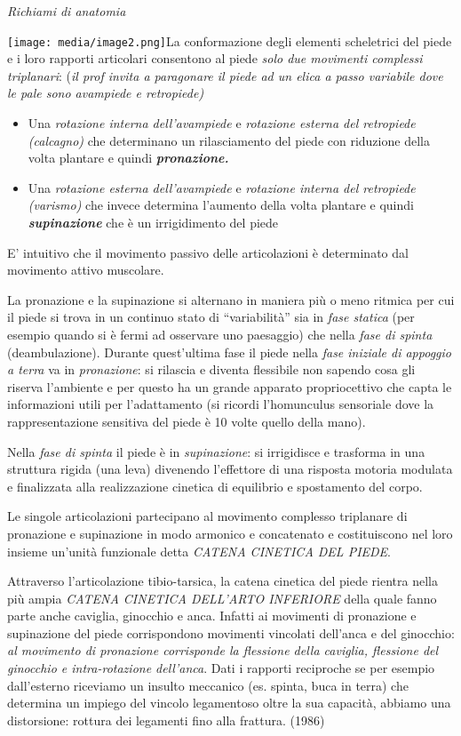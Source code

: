 \documentclass[]{article}
\begin{document}
\emph{Richiami di anatomia}

\texttt{[image: media/image2.png]}La
conformazione degli elementi scheletrici del piede e i loro rapporti
articolari consentono al piede \emph{solo due movimenti complessi
triplanari}: (\emph{il prof invita a paragonare il piede ad un elica a
passo variabile dove le pale sono avampiede e retropiede)}

\begin{itemize}
\item
  Una \emph{rotazione interna dell'avampiede} e \emph{rotazione esterna
  del retropiede (calcagno)} che determinano un rilasciamento del piede
  con riduzione della volta plantare e quindi
  \textbf{\emph{pronazione.}}
\item
  Una \emph{rotazione esterna dell'avampiede} e \emph{rotazione interna
  del retropiede (varismo)} che invece determina l'aumento della volta
  plantare e quindi \textbf{\emph{supinazione}} che è un irrigidimento
  del piede
\end{itemize}

E' intuitivo che il movimento passivo delle articolazioni è determinato
dal movimento attivo muscolare.

La pronazione e la supinazione si alternano in maniera più o meno
ritmica per cui il piede si trova in un continuo stato di
``variabilità'' sia in \emph{fase statica} (per esempio quando si è
fermi ad osservare uno paesaggio) che nella \emph{fase di spinta}
(deambulazione). Durante quest'ultima fase il piede nella \emph{fase
iniziale di appoggio a terra} va in \emph{pronazione}: si rilascia e
diventa flessibile non sapendo cosa gli riserva l'ambiente e per questo
ha un grande apparato propriocettivo che capta le informazioni utili per
l'adattamento (si ricordi l'homunculus sensoriale dove la
rappresentazione sensitiva del piede è 10 volte quello della mano).

Nella \emph{fase di spinta} il piede è in \emph{supinazione}: si
irrigidisce e trasforma in una struttura rigida (una leva) divenendo
l'effettore di una risposta motoria modulata e finalizzata alla
realizzazione cinetica di equilibrio e spostamento del corpo.

Le singole articolazioni partecipano al movimento complesso triplanare
di pronazione e supinazione in modo armonico e concatenato e
costituiscono nel loro insieme un'unità funzionale detta \emph{CATENA
CINETICA DEL PIEDE}.

Attraverso l'articolazione tibio-tarsica, la catena cinetica del piede
rientra nella più ampia \emph{CATENA CINETICA DELL'ARTO INFERIORE} della
quale fanno parte anche caviglia, ginocchio e anca. Infatti ai movimenti
di pronazione e supinazione del piede corrispondono movimenti vincolati
dell'anca e del ginocchio: \emph{al movimento di pronazione corrisponde
la flessione della caviglia, flessione del ginocchio e intra-rotazione
dell'anca}. Dati i rapporti reciproche se per esempio dall'esterno
riceviamo un insulto meccanico (es. spinta, buca in terra) che determina
un impiego del vincolo legamentoso oltre la sua capacità, abbiamo una
distorsione: rottura dei legamenti fino alla frattura. (1986)
\end{document}
